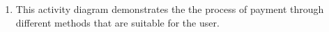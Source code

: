 \documentclass[a4paper,12pt]{article}
\begin{document}
\begin{enumerate}
\item This activity diagram demonstrates the the process of payment through different methods that are suitable for the user.
\begin{center}
\end{center}


\end{enumerate}
\end{document}

